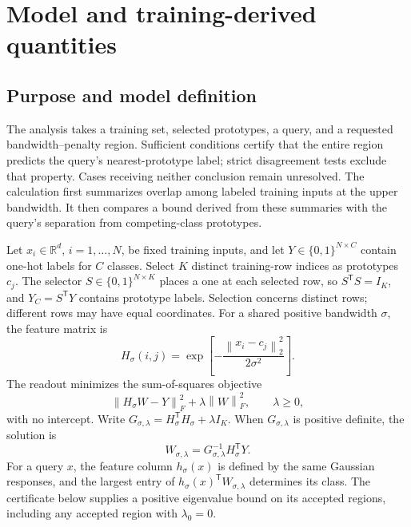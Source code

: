 \documentclass[preprint,12pt,authoryear]{elsarticle}
\newcommand{\R}{\mathbb{R}}
\newcommand{\norm}[1]{\left\lVert#1\right\rVert}
\newcommand{\tr}{\mathsf{T}}
\begin{document}
\section{Model and training-derived quantities}
\subsection{Purpose and model definition}
The analysis takes a training set, selected prototypes, a query, and a requested bandwidth--penalty region. Sufficient conditions certify that the entire region predicts the query's nearest-prototype label; strict disagreement tests exclude that property. Cases receiving neither conclusion remain unresolved. The calculation first summarizes overlap among labeled training inputs at the upper bandwidth. It then compares a bound derived from these summaries with the query's separation from competing-class prototypes.

Let $x_i\in\R^d$, $i=1,\ldots,N$, be fixed training inputs, and let $Y\in\{0,1\}^{N\times C}$ contain one-hot labels for $C$ classes. Select $K$ distinct training-row indices as prototypes $c_j$. The selector $S\in\{0,1\}^{N\times K}$ places a one at each selected row, so $S^\tr S=I_K$, and $Y_C=S^\tr Y$ contains prototype labels. Selection concerns distinct rows; different rows may have equal coordinates. For a shared positive bandwidth $\sigma$, the feature matrix is
\begin{equation}
 H_\sigma(i,j)=\exp\left[-\frac{\norm{x_i-c_j}_2^2}{2\sigma^2}\right].
 \label{eq:features}
\end{equation}
The readout minimizes the sum-of-squares objective
\begin{equation}
 \norm{H_\sigma W-Y}_F^2+\lambda\norm{W}_F^2,\qquad \lambda\geq0,
 \label{eq:objective}
\end{equation}
with no intercept. Write $G_{\sigma,\lambda}=H_\sigma^\tr H_\sigma+\lambda I_K$. When $G_{\sigma,\lambda}$ is positive definite, the solution is
\begin{equation}
 W_{\sigma,\lambda}=G_{\sigma,\lambda}^{-1}H_\sigma^\tr Y.
 \label{eq:readout}
\end{equation}
For a query $x$, the feature column $h_\sigma(x)$ is defined by the same Gaussian responses, and the largest entry of $h_\sigma(x)^\tr W_{\sigma,\lambda}$ determines its class. The certificate below supplies a positive eigenvalue bound on its accepted regions, including any accepted region with $\lambda_0=0$.
\end{document}
